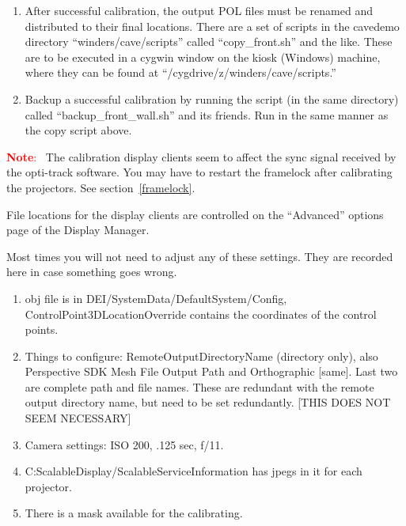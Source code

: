 \documentclass[11pt]{article}
\newenvironment{note}[1][Note]{\begin{lrbox}{\notebox}%
    \begin{minipage}{0.9\columnwidth}\textcolor{red}{\textbf{#1}:~}}%
    {\end{minipage}\end{lrbox}\begin{center}\setlength{\fboxsep}{8pt}%
    \fbox{\usebox{\notebox}}\end{center}}
\begin{document}
\begin{enumerate}
\item After successful calibration, the output POL files must be
  renamed and distributed to their final locations.  There are a set
  of scripts in the cavedemo directory ``winders/cave/scripts''
  called ``copy\_front.sh'' and the like.  These are to be executed in
  a cygwin window on the kiosk (Windows) machine, where they can be
  found at ``/cygdrive/z/winders/cave/scripts.''

\item Backup a successful calibration by running the script (in the
  same directory) called ``backup\_front\_wall.sh'' and its friends.
  Run in the same manner as the copy script above.


\end{enumerate}

\begin{note}
  The calibration display clients seem to affect the sync signal
  received by the opti-track software.  You may have to restart the
  framelock after calibrating the projectors.  See
  section~\ref{framelock}.
\end{note}




File locations for the display clients are controlled on the
``Advanced'' options page of the Display Manager.

Most times you will not need to adjust any of these settings.  They
are recorded here in case something goes wrong.

\begin{enumerate}
\item obj file is in DEI/SystemData/DefaultSystem/Config,
  ControlPoint3DLocationOverride contains the coordinates of the
  control points.

\item Things to configure: RemoteOutputDirectoryName (directory only),
  also Perspective SDK Mesh File Output Path and Orthographic [same].
  Last two are complete path and file names.  These are redundant with
  the remote output directory name, but need to be set redundantly.
  [THIS DOES NOT SEEM NECESSARY]

\item Camera settings: ISO 200, .125 sec, f/11.

\item C:ScalableDisplay/ScalableServiceInformation has jpegs in it for
  each projector.

\item There is a mask available for the calibrating.
\end{enumerate}
\end{document}
